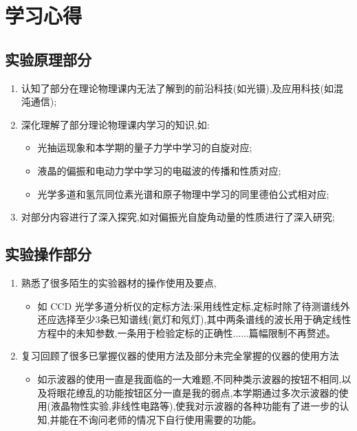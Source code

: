\documentclass[12pt, a4paper]{article}
\begin{document}
\section*{学习心得}

\subsection*{实验原理部分}
\begin{enumerate}
    \item 认知了部分在理论物理课内无法了解到的前沿科技(如光镊),及应用科技(如混沌通信);
    \item 深化理解了部分理论物理课内学习的知识,如:
    \begin{itemize}
        \item 光抽运现象和本学期的量子力学中学习的自旋对应;
        \item 液晶的偏振和电动力学中学习的电磁波的传播和性质对应;
        \item 光学多道和氢氘同位素光谱和原子物理中学习的同里德伯公式相对应;
    \end{itemize}
    \item 对部分内容进行了深入探究,如对偏振光自旋角动量的性质进行了深入研究;
\end{enumerate}

\subsection*{实验操作部分}
\begin{enumerate}
    \item 熟悉了很多陌生的实验器材的操作使用及要点,
    \begin{itemize}
        \item 如 CCD 光学多道分析仪的定标方法:采用线性定标,定标时除了待测谱线外还应选择至少3条已知谱线(氦灯和氖灯),其中两条谱线的波长用于确定线性方程中的未知参数,一条用于检验定标的正确性......篇幅限制不再赘述。
    \end{itemize}
    \item 复习回顾了很多已掌握仪器的使用方法及部分未完全掌握的仪器的使用方法
    \begin{itemize}
        \item 如示波器的使用一直是我面临的一大难题,不同种类示波器的按钮不相同,以及将眼花缭乱的功能按钮区分一直是我的弱点,本学期通过多次示波器的使用(液晶物性实验,非线性电路等),使我对示波器的各种功能有了进一步的认知,并能在不询问老师的情况下自行使用需要的功能。
    \end{itemize}
\end{enumerate}
\end{document}
